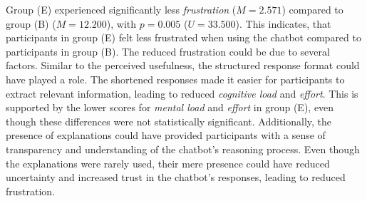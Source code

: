 Group (E) experienced significantly less \textit{frustration} ($M=2.571$) compared to group (B) ($M=12.200$), with $p=0.005$ ($U=33.500$). This indicates, that participants in group (E) felt less frustrated when using the chatbot compared to participants in group (B). The reduced frustration could be due to several factors. Similar to the perceived usefulness, the structured response format could have played a role. The shortened responses made it easier for participants to extract relevant information, leading to reduced \textit{cognitive load} and \textit{effort}. This is supported by the lower scores for \textit{mental load} and \textit{effort} in group (E), even though these differences were not statistically significant. Additionally, the presence of explanations could have provided participants with a sense of transparency and understanding of the chatbot's reasoning process. Even though the explanations were rarely used, their mere presence could have reduced uncertainty and increased trust in the chatbot's responses, leading to reduced frustration.

